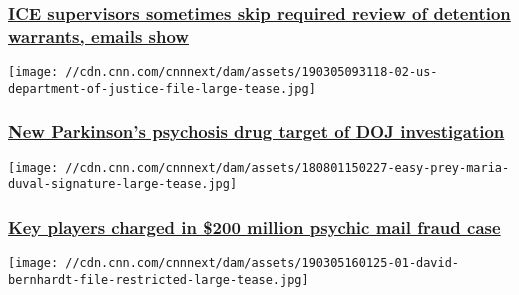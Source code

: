 \hypertarget{ice-supervisors-sometimes-skip-required-review-of-detention-warrants-emails-show}{%
\subsubsection{\texorpdfstring{\href{/2019/03/13/us/ice-supervisors-dont-always-review-deportation-warrants-invs/index.html}{ICE
supervisors sometimes skip required review of detention warrants, emails
show}}{ICE supervisors sometimes skip required review of detention warrants, emails show}}\label{ice-supervisors-sometimes-skip-required-review-of-detention-warrants-emails-show}}

\href{/2019/03/08/health/nuplazid-justice-department-invs/index.html}{}

\texttt{[image: //cdn.cnn.com/cnnnext/dam/assets/190305093118-02-us-department-of-justice-file-large-tease.jpg]}

\hypertarget{new-parkinsons-psychosis-drug-target-of-doj-investigation-}{%
\subsubsection{\texorpdfstring{\href{/2019/03/08/health/nuplazid-justice-department-invs/index.html}{New
Parkinson's psychosis drug target of DOJ investigation
}}{New Parkinson's psychosis drug target of DOJ investigation }}\label{new-parkinsons-psychosis-drug-target-of-doj-investigation-}}

\href{/2019/03/07/world/maria-duval-scam-criminal-action-invs/index.html}{}

\texttt{[image: //cdn.cnn.com/cnnnext/dam/assets/180801150227-easy-prey-maria-duval-signature-large-tease.jpg]}

\hypertarget{key-players-charged-in-200-million-psychic-mail-fraud-case-}{%
\subsubsection{\texorpdfstring{\href{/2019/03/07/world/maria-duval-scam-criminal-action-invs/index.html}{Key
players charged in \$200 million psychic mail fraud case
}}{Key players charged in \$200 million psychic mail fraud case }}\label{key-players-charged-in-200-million-psychic-mail-fraud-case-}}

\href{/2019/03/05/politics/david-bernhardt-interior-oil-and-gas/index.html}{}

\texttt{[image: //cdn.cnn.com/cnnnext/dam/assets/190305160125-01-david-bernhardt-file-restricted-large-tease.jpg]}

